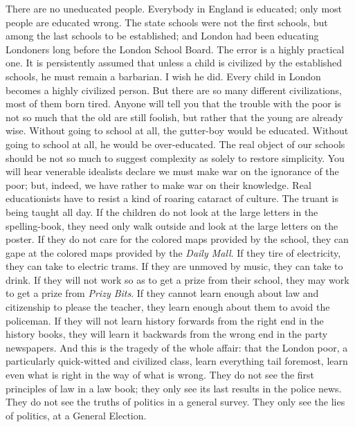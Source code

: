 \documentclass{book}
\begin{document}
There are no uneducated people. Everybody in England is educated; only most people are educated wrong. The state schools were not the first schools, but among the last schools to be established; and London had been educating Londoners long before the London School Board. The error is a highly practical one. It is persistently assumed that unless a child is civilized by the established schools, he must remain a barbarian. I wish he did. Every child in London becomes a highly civilized person. But there are so many different civilizations, most of them born tired. Anyone will tell you that the trouble with the poor is not so much that the old are still foolish, but rather that the young are already wise. Without going to school at all, the gutter-boy would be educated. Without going to school at all, he would be over-educated. The real object of our schools should be not so much to suggest complexity as solely to restore simplicity. You will hear venerable idealists declare we must make war on the ignorance of the poor; but, indeed, we have rather to make war on their knowledge. Real educationists have to resist a kind of roaring cataract of culture. The truant is being taught all day. If the children do not look at the large letters in the spelling-book, they need only walk outside and look at the large letters on the poster. If they do not care for the colored maps provided by the school, they can gape at the colored maps provided by the \emph{Daily Mall}. If they tire of electricity, they can take to electric trams. If they are unmoved by music, they can take to drink. If they will not work so as to get a prize from their school, they may work to get a prize from \emph{Prizy Bits}. If they cannot learn enough about law and citizenship to please the teacher, they learn enough about them to avoid the policeman. If they will not learn history forwards from the right end in the history books, they will learn it backwards from the wrong end in the party newspapers. And this is the tragedy of the whole affair: that the London poor, a particularly quick-witted and civilized class, learn everything tail foremost, learn even what is right in the way of what is wrong. They do not see the first principles of law in a law book; they only see its last results in the police news. They do not see the truths of politics in a general survey. They only see the lies of politics, at a General Election.
\end{document}
